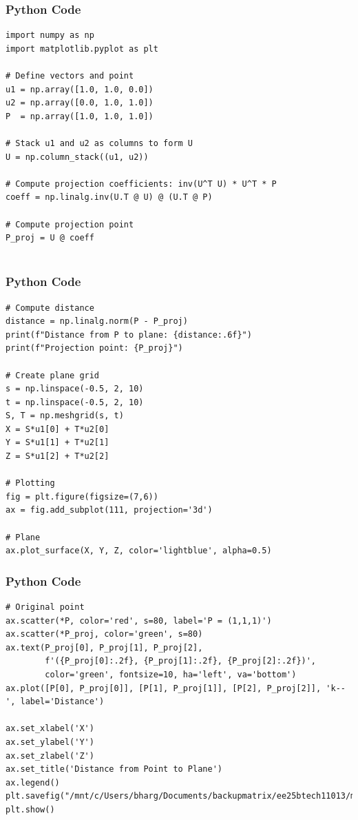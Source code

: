 \documentclass{beamer}
\begin{document}
\begin{frame}[fragile]
    \frametitle{Python Code}
    \begin{lstlisting}
import numpy as np
import matplotlib.pyplot as plt

# Define vectors and point
u1 = np.array([1.0, 1.0, 0.0])
u2 = np.array([0.0, 1.0, 1.0])
P  = np.array([1.0, 1.0, 1.0])

# Stack u1 and u2 as columns to form U
U = np.column_stack((u1, u2))

# Compute projection coefficients: inv(U^T U) * U^T * P
coeff = np.linalg.inv(U.T @ U) @ (U.T @ P)

# Compute projection point
P_proj = U @ coeff


    \end{lstlisting}
\end{frame}
\begin{frame}[fragile]
    \frametitle{Python Code}
    \begin{lstlisting}
# Compute distance
distance = np.linalg.norm(P - P_proj)
print(f"Distance from P to plane: {distance:.6f}")
print(f"Projection point: {P_proj}")

# Create plane grid
s = np.linspace(-0.5, 2, 10)
t = np.linspace(-0.5, 2, 10)
S, T = np.meshgrid(s, t)
X = S*u1[0] + T*u2[0]
Y = S*u1[1] + T*u2[1]
Z = S*u1[2] + T*u2[2]

# Plotting
fig = plt.figure(figsize=(7,6))
ax = fig.add_subplot(111, projection='3d')

# Plane
ax.plot_surface(X, Y, Z, color='lightblue', alpha=0.5)

    \end{lstlisting}
\end{frame}
\begin{frame}[fragile]
    \frametitle{Python Code}
    \begin{lstlisting}
# Original point
ax.scatter(*P, color='red', s=80, label='P = (1,1,1)')
ax.scatter(*P_proj, color='green', s=80)
ax.text(P_proj[0], P_proj[1], P_proj[2],
        f'({P_proj[0]:.2f}, {P_proj[1]:.2f}, {P_proj[2]:.2f})',
        color='green', fontsize=10, ha='left', va='bottom')
ax.plot([P[0], P_proj[0]], [P[1], P_proj[1]], [P[2], P_proj[2]], 'k--', label='Distance')

ax.set_xlabel('X')
ax.set_ylabel('Y')
ax.set_zlabel('Z')
ax.set_title('Distance from Point to Plane')
ax.legend()
plt.savefig("/mnt/c/Users/bharg/Documents/backupmatrix/ee25btech11013/matgeo/12.547/figs/Figure_1.png")
plt.show()


    \end{lstlisting}
\end{frame}
\end{document}
